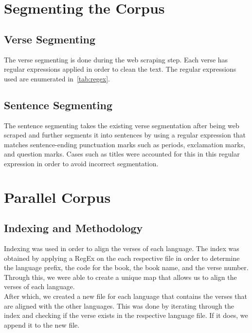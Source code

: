 \documentclass{article}
\begin{document}
\section{Segmenting the Corpus}

\subsection{Verse Segmenting}
The verse segmenting is done during the web scraping step. Each verse has
regular expressions applied in order to clean the text. The regular expressions
used are enumerated in~\cref{tab:regex}.

\subsection{Sentence Segmenting}
The sentence segmenting takes the existing verse segmentation after being web
scraped and further segments it into sentences by using a regular expression
that matches sentence-ending punctuation marks such as periods, exclamation
marks, and question marks. Cases such as titles were accounted for this in this
regular expression in order to avoid incorrect segmentation.

\section{Parallel Corpus}

\subsection{Indexing and Methodology}

Indexing was used in order to align the verses of each language. The index was
obtained by applying a RegEx on the each respective file in order to determine
the language prefix, the code for the book, the book name, and the verse
number. Through this, we were able to create a unique map that allows us to
align the verses of each language.\\

After which, we created a new file for each language that contains the verses
that are aligned with the other languages. This was done by iterating through
the index and checking if the verse exists in the respective language file. If
it does, we append it to the new file.\\



\end{document}
